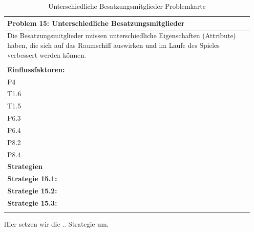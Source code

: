 \documentclass[fontsize=12pt,paper=a4,twoside]{scrartcl}
\begin{document}
\begin{table}[H]
    \centering
    \begin{tabular}{|p{15cm}|}
    \hline
          \textbf{Problem 15: Unterschiedliche Besatzungsmitglieder}  \\ \hline
	Die Besatzungsmitglieder müssen unterschiedliche Eigenschaften (Attribute) haben, die sich auf das Raumschiff auswirken und im Laufe des Spieles verbessert werden können. \\
         \\ \hline
          \textbf{Einflussfaktoren: } \\
	P4 \\
	T1.6 \\
	T1.5 \\
	P6.3 \\
	P6.4 \\
	P8.2 \\
	P8.4 \\
          \hline
          \textbf{Strategien} \\ \hline
            {}          
           \label{strategie:15.1}     
          \textbf{Strategie 15.1: }  \\        
  {}          
           \label{strategie:15.2}              
          \textbf{Strategie 15.2:}  \\
	 {}          
           \label{strategie:15.3}     
          \textbf{Strategie 15.3: }  \\ 
	 \\ \hline
    \end{tabular}

    \caption{Unterschiedliche Besatzungsmitglieder Problemkarte}
    \label{tab:ProblemKarte15}
\end{table}
Hier setzen wir die .. Strategie um.  \\
\end{document}
